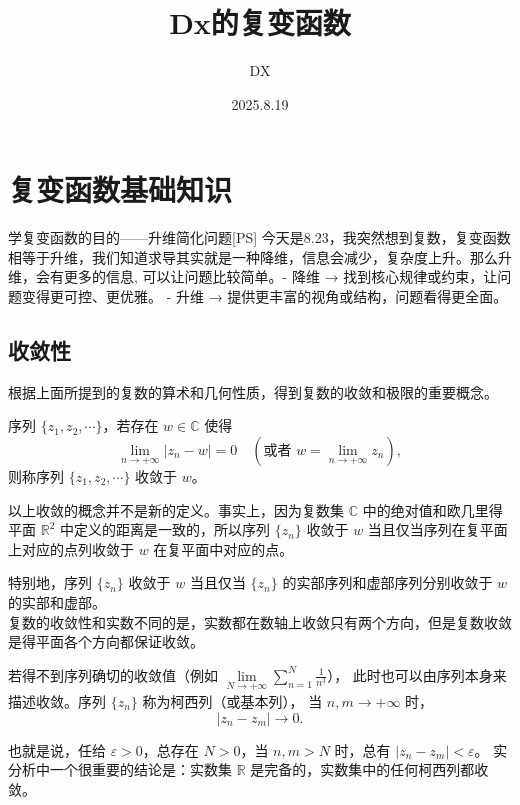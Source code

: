 \documentclass[lang=cn,10pt]{elegantbook}
\title{Dx的复变函数 }
\author{DX}
\date{2025.8.19}
\begin{document}
\maketitle
\frontmatter

\tableofcontents

\mainmatter
\chapter{复变函数基础知识}
\begin{dxtips}{学复变函数的目的——升维简化问题}[PS]\label{dx:any-construct}
今天是8.23，我突然想到复数，复变函数相等于升维，我们知道求导其实就是一种降维，信息会减少，复杂度上升。那么升维，会有更多的信息, 可以让问题比较简单。- 降维 → 找到核心规律或约束，让问题变得更可控、更优雅。
    - 升维 → 提供更丰富的视角或结构，问题看得更全面。
\end{dxtips}
\section{收敛性}
\begin{theorem}
    

根据上面所提到的复数的算术和几何性质，得到复数的收敛和极限的重要概念。

序列 $\{z_1, z_2, \cdots\}$，若存在 $w \in \mathbb{C}$ 使得
\[
\lim_{n \to +\infty} |z_n - w| = 0 
\quad (\text{或者 } w = \lim_{n\to+\infty} z_n),
\]
则称序列 $\{z_1, z_2, \cdots\}$ 收敛于 $w$。

以上收敛的概念并不是新的定义。事实上，因为复数集 $\mathbb{C}$ 中的绝对值和欧几里得平面 $\mathbb{R}^2$ 中定义的距离是一致的，所以序列 $\{z_n\}$ 收敛于 $w$ 当且仅当序列在复平面上对应的点列收敛于 $w$ 在复平面中对应的点。

特别地，序列 $\{z_n\}$ 收敛于 $w$ 当且仅当 $\{z_n\}$ 的实部序列和虚部序列分别收敛于 $w$ 的实部和虚部。\\
复数的收敛性和实数不同的是，实数都在数轴上收敛只有两个方向，但是复数收敛是得平面各个方向都保证收敛。
\end{theorem}
\begin{theorem}
    若得不到序列确切的收敛值（例如 $\lim\limits_{N\to+\infty} \sum\limits_{n=1}^N \tfrac{1}{n^3}$），
此时也可以由序列本身来描述收敛。序列 $\{z_n\}$ 称为柯西列（或基本列），
当 $n,m \to +\infty$ 时，
\[
|z_n - z_m| \to 0.
\]

也就是说，任给 $\varepsilon > 0$，总存在 $N > 0$，当 $n,m > N$ 时，总有 $|z_n - z_m| < \varepsilon$。
实分析中一个很重要的结论是：实数集 $\mathbb{R}$ 是完备的，实数集中的任何柯西列都收敛。
\end{theorem}
\end{document}
